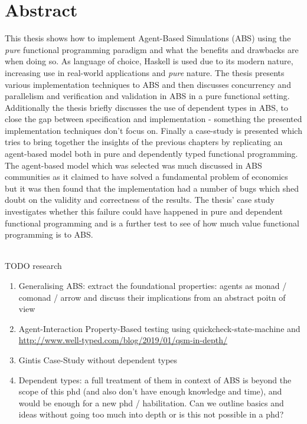 \documentclass[oneside]{book}
\begin{document}
\section*{Abstract}
This thesis shows how to implement Agent-Based Simulations (ABS) using the \textit{pure} functional programming paradigm and what the benefits and drawbacks are when doing so. As language of choice, Haskell is used due to its modern nature, increasing use in real-world applications and \textit{pure} nature. The thesis presents various implementation techniques to ABS and then discusses concurrency and parallelism and verification and validation in ABS in a pure functional setting. Additionally the thesis briefly discusses the use of dependent types in ABS, to close the gap between specification and implementation - something the presented implementation techniques don't focus on.
Finally a case-study is presented which tries to bring together the insights of the previous chapters by replicating an agent-based model both in pure and dependently typed functional programming. The agent-based model which was selected was much discussed in ABS communities as it claimed to have solved a fundamental problem of economics but it was then found that the implementation had a number of bugs which shed doubt on the validity and correctness of the results. The thesis' case study investigates whether this failure could have happened in pure and dependent functional programming and is a further test to see of how much value functional programming is to ABS. 

\\
TODO research

\begin{enumerate}
	\item Generalising ABS: extract the foundational properties: agents as monad / comonad / arrow and discuss their implications from an abstract poitn of view
	\item Agent-Interaction Property-Based testing using quickcheck-state-machine and \url{http://www.well-typed.com/blog/2019/01/qsm-in-depth/}
	\item Gintis Case-Study without dependent types
	\item Dependent types: a full treatment of them in context of ABS is beyond the scope of this phd (and also don't have enough knowledge and time), and would be enough for a new phd / habilitation. Can we outline basics and ideas without going too much into depth or is this not possible in a phd?
\end{enumerate}
\end{document}
